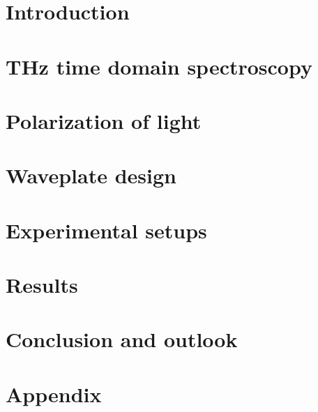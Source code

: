 \documentclass[12pt, a4paper]{report}
\begin{document}
\chapter{Introduction}
\setcounter{page}{1}


\chapter{THz time domain spectroscopy}


\chapter{Polarization of light}


\chapter{Waveplate design}


\chapter{Experimental setups}


\chapter{Results}


\chapter{Conclusion and outlook}


\appendix
\chapter{Appendix}


\sloppy
\printbibliography

\end{document}

